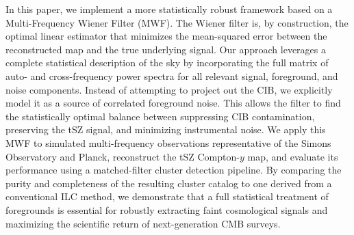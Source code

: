 \documentclass[]{article}
\begin{document}
In this paper, we implement a more statistically robust framework based on a Multi-Frequency Wiener Filter (MWF). The Wiener filter is, by construction, the optimal linear estimator that minimizes the mean-squared error between the reconstructed map and the true underlying signal. Our approach leverages a complete statistical description of the sky by incorporating the full matrix of auto- and cross-frequency power spectra for all relevant signal, foreground, and noise components. Instead of attempting to project out the CIB, we explicitly model it as a source of correlated foreground noise. This allows the filter to find the statistically optimal balance between suppressing CIB contamination, preserving the tSZ signal, and minimizing instrumental noise. We apply this MWF to simulated multi-frequency observations representative of the Simons Observatory and Planck, reconstruct the tSZ Compton-$y$ map, and evaluate its performance using a matched-filter cluster detection pipeline. By comparing the purity and completeness of the resulting cluster catalog to one derived from a conventional ILC method, we demonstrate that a full statistical treatment of foregrounds is essential for robustly extracting faint cosmological signals and maximizing the scientific return of next-generation CMB surveys.
\end{document}
